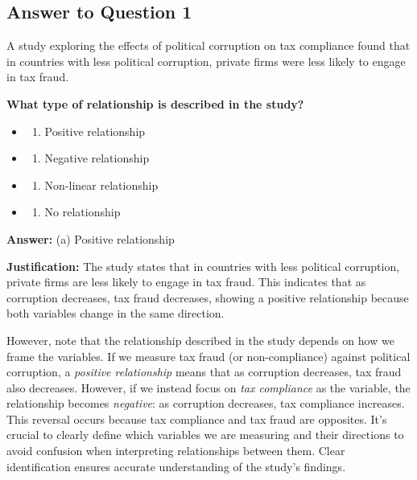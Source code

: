 \documentclass[
  11pt,
]{article}
\providecommand{\tightlist}{%
  \setlength{\itemsep}{0pt}\setlength{\parskip}{0pt}}
\begin{document}
\subsection{Answer to Question 1}\label{answer-to-question-1}

A study exploring the effects of political corruption on tax compliance
found that in countries with less political corruption, private firms
were less likely to engage in tax fraud.

\textbf{What type of relationship is described in the study?}

\begin{itemize}
\tightlist
\item
  \begin{enumerate}
  \def\labelenumi{(\alph{enumi})}
  \tightlist
  \item
    Positive relationship
  \end{enumerate}
\item
  \begin{enumerate}
  \def\labelenumi{(\alph{enumi})}
  \setcounter{enumi}{1}
  \tightlist
  \item
    Negative relationship
  \end{enumerate}
\item
  \begin{enumerate}
  \def\labelenumi{(\alph{enumi})}
  \setcounter{enumi}{2}
  \tightlist
  \item
    Non-linear relationship
  \end{enumerate}
\item
  \begin{enumerate}
  \def\labelenumi{(\alph{enumi})}
  \setcounter{enumi}{3}
  \tightlist
  \item
    No relationship
  \end{enumerate}
\end{itemize}

\textbf{Answer:} (a) Positive relationship

\textbf{Justification:} The study states that in countries with less
political corruption, private firms are less likely to engage in tax
fraud. This indicates that as corruption decreases, tax fraud decreases,
showing a positive relationship because both variables change in the
same direction.

However, note that the relationship described in the study depends on
how we frame the variables. If we measure tax fraud (or non-compliance)
against political corruption, a \emph{positive relationship} means that
as corruption decreases, tax fraud also decreases. However, if we
instead focus on \emph{tax compliance} as the variable, the relationship
becomes \emph{negative}: as corruption decreases, tax compliance
increases. This reversal occurs because tax compliance and tax fraud are
opposites. It's crucial to clearly define which variables we are
measuring and their directions to avoid confusion when interpreting
relationships between them. Clear identification ensures accurate
understanding of the study's findings.
\end{document}
